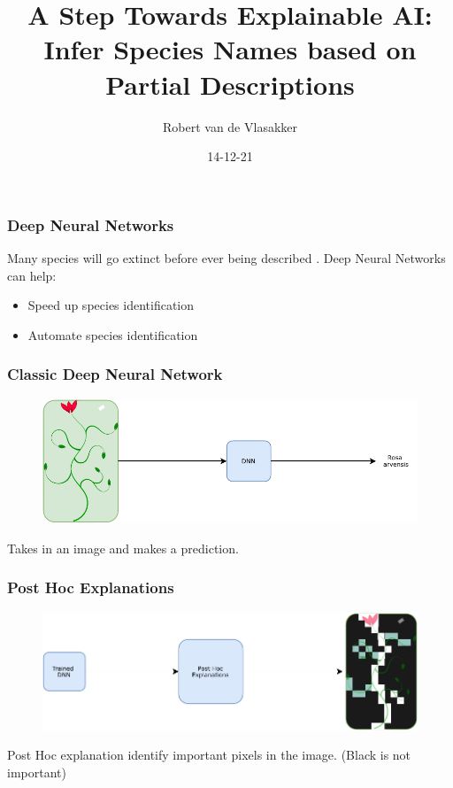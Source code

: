 \documentclass{beamer}
\title{A Step Towards Explainable AI: Infer Species Names based on Partial Descriptions}
\author{Robert van de Vlasakker}
\institute{Wageningen University \& Research}
\date{14-12-21}
\begin{document}
\graphicspath{ {./figures/} }

\frame{\titlepage}



\begin{frame}
\frametitle{Deep Neural Networks}

Many species will go extinct before ever being described \autocite{lees_species_2015}.
\newline
\newline
Deep Neural Networks can help:
\begin{itemize}
    \item Speed up species identification 
    \item Automate species identification
\end{itemize}


\end{frame}



\begin{frame}
\frametitle{Classic Deep Neural Network}
\begin{figure} [htbp]
    \centering
    \includegraphics[width=\textwidth]{figures/midterm_explain_1.pdf}
\end{figure}

Takes in an image and makes a prediction.

\end{frame}




\begin{frame}
\frametitle{Post Hoc Explanations}
\begin{figure} [htbp]
    \centering
    \includegraphics[width=\textwidth]{figures/midterm_explain_2.pdf}
\end{figure}
Post Hoc explanation identify important pixels in the image.
(Black is not important)
\end{frame}
\end{document}
